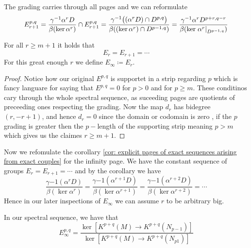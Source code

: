 \begin{corollary}\label{cor: explicit pages of exact sequences arising from exact couples with grading}
	The grading carries through all pages and we can reformulate
	\begin{equation*}
		E^{p,q}_{r+1}=\frac{\gamma^{-1}\alpha^rD}{\beta(\ker \alpha^r)}\cap E^{p,q}_{r+1}
		=\frac{\gamma^{-1}\big((\alpha^rD)\cap D^{p,q}\big)}{\beta((\ker \alpha^r)\cap D^{p-1,q})}
		=\frac{\gamma^{-1}\alpha^rD^{p+r,q-r}}{\beta(\ker \left.\alpha^r\right|_{D^{p-1,q}})}
	\end{equation*}
\end{corollary}
\begin{corollary}
	For all $r\geq m+1$ it holds that
	\begin{equation*}
		E_{r}=E_{r+1}=\cdots
	\end{equation*} For this great enough $r$ we define $E_{\infty}\coloneq E_{r}$.
\end{corollary}
\begin{proof}
	Notice how our original $E^{p,q}$ is supportet in a strip regarding $p$ which is fancy languare for saying that $E^{p,q}=0$ for $p>0$ and for $p\geq m$. These conditinos cary through the whole spectral sequence, as suceeding pages are quotients of preceeding ones respecting the grading. Now the map $d_r$ has bidegree $(r,-r+1)$, and hence $d_r=0$ since the domain or codomain is zero , if the $p$ grading is greater then the $p-$length of the supporting strip meaning $p>m$ which gives us the claimes $r\geq m+1$.
\end{proof}
Now we refomulate the corollary \ref{cor: explicit pages of exact sequences arising from exact couples} for the infinity page. We have the constant sequence of groups $E_r=E_{r+1}=\cdots$ and by the corollary we have
\begin{equation*}
	\frac{\gamma{-1}(\alpha^rD)}{\beta(\ker{\alpha^r})}=\frac{\gamma{-1}(\alpha^{r+1}D)}{\beta(\ker{\alpha^{r+1}})}=\frac{\gamma{-1}(\alpha^{r+2}D)}{\beta(\ker{\alpha^{r+2}})}=\cdots
\end{equation*}
Hence in our later inspections of $E_{\infty}$ we can assume $r$ to be arbitrary big.
\begin{lemma}
	In our spectral sequence, we have that
	\begin{equation*}
		E_{\infty}^{p,q}=\frac{\ker[K^{p+q}(M)\to K^{p+q}(N_{p-1})]}{\ker[K^{p+q}(M)\to K^{p+q}(N_{p1})]}
	\end{equation*}
\end{lemma}
